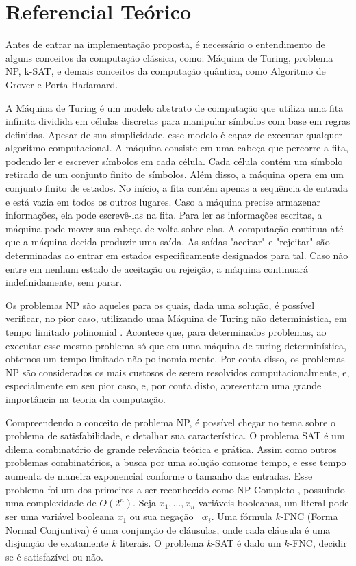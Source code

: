 \documentclass[12pt]{article}
\begin{document}
\section{Referencial Teórico}

Antes de entrar na implementação proposta, é necessário o entendimento de alguns conceitos da computação clássica, como: Máquina de Turing, problema NP, k-SAT, e demais conceitos da computação quântica, como Algoritmo de Grover e Porta Hadamard.

\textbf{\cite{sipser:07}} A Máquina de Turing é um modelo abstrato de computação que utiliza uma fita infinita dividida em células discretas para manipular símbolos com base em regras definidas. Apesar de sua simplicidade, esse modelo é capaz de executar qualquer algoritmo computacional. A máquina consiste em uma cabeça que percorre a fita, podendo ler e escrever símbolos em cada célula. Cada célula contém um símbolo retirado de um conjunto finito de símbolos. Além disso, a máquina opera em um conjunto finito de estados. No início, a fita contém apenas a sequência de entrada e está vazia em todos os outros lugares. Caso a máquina precise armazenar informações, ela pode escrevê-las na fita. Para ler as informações escritas, a máquina pode mover sua cabeça de volta sobre elas. A computação continua até que a máquina decida produzir uma saída. As saídas "aceitar" e "rejeitar" são determinadas ao entrar em estados especificamente designados para tal. Caso não entre em nenhum estado de aceitação ou rejeição, a máquina continuará indefinidamente, sem parar.

Os problemas NP são aqueles para os quais, dada uma solução, é possível verificar, no pior caso,  utilizando uma Máquina de Turing não determinística, em tempo limitado polinomial \textbf{\cite{sipser:07}}. Acontece que, para determinados problemas, ao executar esse mesmo problema só que em uma máquina de turing determinística, obtemos um tempo limitado não polinomialmente. Por conta disso, os problemas NP são considerados os mais custosos de serem resolvidos computacionalmente, e, especialmente em seu pior caso, e, por conta disto, apresentam uma grande importância na teoria da computação.

Compreendendo o conceito de problema NP, é possível chegar no tema sobre o problema de satisfabilidade, e detalhar sua característica. O problema SAT é um dilema combinatório de grande relevância teórica e prática. Assim como outros problemas combinatórios, a busca por uma solução consome tempo, e esse tempo aumenta de maneira exponencial conforme o tamanho das entradas. Esse problema foi um dos primeiros a ser reconhecido como NP-Completo \textbf{\cite{cook:71}}, possuindo uma complexidade de $O(2^n)$. Seja \(x_1, \ldots, x_n\) variáveis booleanas, um literal pode ser uma variável booleana \(x_1\) ou sua negação \(\neg x_i\). Uma fórmula $k$-FNC (Forma Normal Conjuntiva) é uma conjunção de cláusulas, onde cada cláusula é uma disjunção de exatamente $k$ literais. O problema $k$-SAT é dado um $k$-FNC, decidir se é satisfazível ou não.
\end{document}
